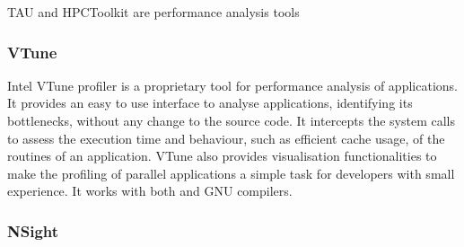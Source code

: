 TAU \cite{TAU} and HPCToolkit \cite{HPCToolkit} are performance analysis tools 

\subsubsection*{VTune}

Intel VTune profiler \cite{Intel:VTune} is a proprietary tool for performance analysis of applications. It provides an easy to use interface to analyse applications, identifying its bottlenecks, without any change to the source code. It intercepts the system calls to assess the execution time and behaviour, such as efficient cache usage, of the routines of an application. VTune also provides visualisation functionalities to make the profiling of parallel applications a simple task for developers with small experience. It works with both \intel and GNU compilers.

\subsubsection*{NSight}
